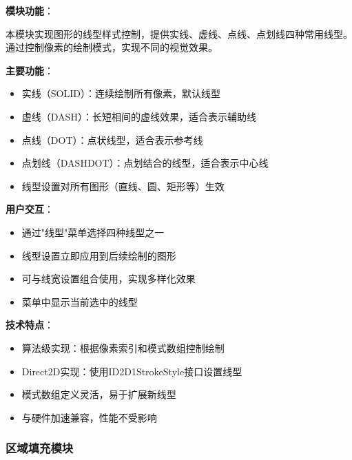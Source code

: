 \documentclass[12pt,a4paper]{article}
\begin{document}
\begin{tcolorbox}
\textbf{模块功能}：

本模块实现图形的线型样式控制，提供实线、虚线、点线、点划线四种常用线型。通过控制像素的绘制模式，实现不同的视觉效果。

\textbf{主要功能}：
\begin{itemize}
    \item 实线（SOLID）：连续绘制所有像素，默认线型
    \item 虚线（DASH）：长短相间的虚线效果，适合表示辅助线
    \item 点线（DOT）：点状线型，适合表示参考线
    \item 点划线（DASHDOT）：点划结合的线型，适合表示中心线
    \item 线型设置对所有图形（直线、圆、矩形等）生效
\end{itemize}

\textbf{用户交互}：
\begin{itemize}
    \item 通过"线型"菜单选择四种线型之一
    \item 线型设置立即应用到后续绘制的图形
    \item 可与线宽设置组合使用，实现多样化效果
    \item 菜单中显示当前选中的线型
\end{itemize}

\textbf{技术特点}：
\begin{itemize}
    \item 算法级实现：根据像素索引和模式数组控制绘制
    \item Direct2D实现：使用ID2D1StrokeStyle接口设置线型
    \item 模式数组定义灵活，易于扩展新线型
    \item 与硬件加速兼容，性能不受影响
\end{itemize}
\end{tcolorbox}

\subsubsection{区域填充模块}
\end{document}
